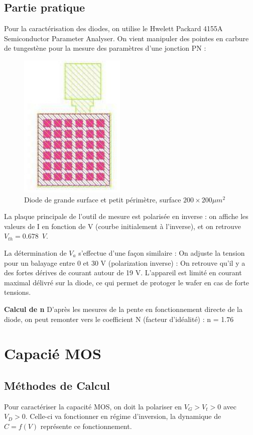 \documentclass[11pt]{article}
\begin{document}
\subsection{Partie pratique}
Pour la caract\'erisation des diodes, on utilise le Hwelett Packard 4155A Semiconductor Parameter Analyser. On vient manipuler des pointes en carbure de tungest\`ene pour la mesure des param\`etres d'une jonction PN :

\begin{figure}[!htb]
\centering
\includegraphics[scale=0.54]{diode_junction.jpg}
\caption{Diode de grande surface et petit p\'erim\`etre, surface $200 \times 200 \mu m^{2}$}
\end{figure}

La plaque principale de l'outil de mesure est polaris\'ee en inverse : on affiche les valeurs de I en fonction de V (courbe initialement \`a l'inverse), et on retrouve $V_{th} = 0.678 \phantom{2} V$.

La d\'etermination de $V_a$ s'effectue d'une fa\c con similaire : On adjuste la tension pour un balayage entre 0 et 30 V (polarization inverse) : On retrouve qu'il y a des fortes d\'erives de courant autour de 19 V. L'appareil est limit\'e en courant maximal d\'elivr\'e sur la diode, ce qui permet de protoger le wafer en cas de forte tensions.

\textbf{Calcul de n }
D'apr\`es les mesures de la pente en fonctionnement directe de la diode, on peut remonter vers le coefficient N (facteur d'id\'ealit\'e) : n = 1.76  

\section{Capaci\'e MOS}
\subsection{M\'ethodes de Calcul}
Pour caract\'eriser la capacit\'e MOS, on doit la polariser en $ V_G > V_t > 0 $ avec $V_D > 0$. Celle-ci va fonctionner en r\'egime d'inversion, la dynamique de $C=f(V)$ repr\'esente ce fonctionnement.
\end{document}
